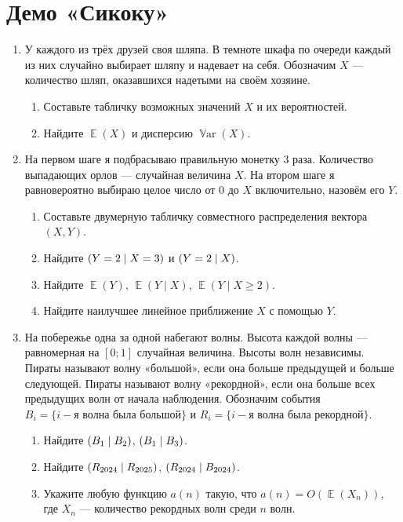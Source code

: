 \documentclass[12pt]{article}
\DeclareMathOperator{\Var}{\mathbb{V}ar}
\let\P\relax
\DeclareMathOperator{\P}{\mathbb{P}}
\DeclareMathOperator{\E}{\mathbb{E}}
\begin{document}
\section*{Демо «Сикоку»}

\begin{enumerate}
    \item У каждого из трёх друзей своя шляпа. 
    В темноте шкафа по очереди каждый из них случайно выбирает шляпу и надевает на себя. 
    Обозначим $X$ — количество шляп, оказавшихся надетыми на своём хозяине. 

    \begin{enumerate}
        \item Составьте табличку возможных значений $X$ и их вероятностей.
        \item Найдите $\E(X)$ и дисперсию $\Var(X)$.
    \end{enumerate}
    
    
    \item На первом шаге я подбрасываю правильную монетку 3 раза. 
    Количество выпадающих орлов — случайная величина $X$. 
    На втором шаге я равновероятно выбираю целое число от $0$ до $X$ включительно,
    назовём его $Y$.
    \begin{enumerate}
        \item Составьте двумерную табличку совместного распределения вектора $(X, Y)$.
        \item Найдите $\P(Y = 2 \mid X = 3)$ и $\P(Y = 2 \mid X)$.
        \item Найдите $\E(Y)$, $\E(Y \mid X)$, $\E(Y \mid X \geq 2)$.
        \item Найдите наилучшее линейное приближение $X$ с помощью $Y$.
    \end{enumerate}
    
    \item %
    На побережье одна за одной набегают волны. 
    Высота каждой волны — равномерная на $[0; 1]$ случайная величина. 
    Высоты волн независимы. 
    Пираты называют волну «большой», если она больше предыдущей и больше следующей. 
    Пираты называют волну «рекордной», если она больше всех предыдущих волн от начала наблюдения. 
    Обозначим события $B_i = \{i-\text{я волна была большой}\}$ и $R_i = \{i-\text{я волна была рекордной}\}$.
    
    \begin{enumerate}
     \item Найдите $\P(B_1 \mid B_2)$, $\P(B_1 \mid B_3)$.
     \item Найдите $\P(R_{2024} \mid R_{2025})$, $\P(R_{2024} \mid B_{2024})$.
     \item Укажите любую функцию $a(n)$ такую, что $a(n) = O(\E(X_n))$, где $X_n$ — количество рекордных волн среди $n$ волн. 
    \end{enumerate}
 

\end{enumerate}
\end{document}
